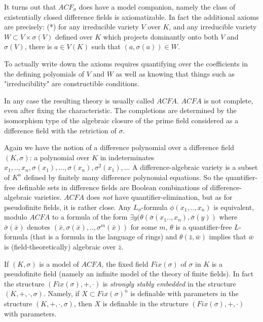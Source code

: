 It turns out that $ACF{_\sigma}$ does have a
model companion, namely the class of
existentially closed difference fields is
axiomatizable. In fact the additional axioms
are precisely:
\newline
(*) for any irreducible variety $V$ over $K$,
and any irreducible variety $W\subset
V\times\sigma(V)$ defined over $K$ which
projects dominantly onto both $V$ and
$\sigma(V)$, there is $a\in V(K)$ such that
$(a, \sigma(a))\in W$.

\vspace{2mm}
\noindent
To actually write down the axioms requires
quantifying over the coefficients in the
defining polyomials of $V$ and $W$ as well as
knowing that things such as "irreducibility"
are constructible conditions.

In any case the resulting theory is usually
called $ACFA$. $ACFA$ is not complete, even
after fixing the characteristic. The
completions are determined by the isomorphism
type of the algebraic closure of the prime
field considered as a difference field with
the retriction of $\sigma$.

Again we have the notion of a difference
polynomial over a difference field
$(K,\sigma)$: a polynomial over $K$ in
indeterminates $x_{1},..,x_{n},\sigma(x_{1}),..
.,\sigma(x_{n}), \sigma^{2}(x_{1}),..$.
A difference-algebraic variety is a subset of
$K^{n}$ defined by finitely many difference
polynomial equations.
So the quantifier-free definable sets
in difference fields are Boolean combinations
of difference-algebraic varieties.
$ACFA$ does {\em not} have
quantifier-elimination, but as for
pseudofinite fields, it is rather close. Any
$L_{\sigma}$-formula $\phi(x_{1},..,x_{n})$ is
equivalent, modulo $ACFA$ to a formula of the
form
$\exists
y(\theta({\bar\sigma}(x_{1}..,x_{n}),
{\bar\sigma}(y))$ where ${\bar \sigma}({\bar
x})$ denotes $({\bar x},\sigma({\bar
x}),..,\sigma^{m}({\bar x}))$ for some $m$,
$\theta$ is a quantifier-free $L$-formula (that
is a formula in the language of rings) and
$\theta({\bar z},{\bar w})$ implies that
${\bar w}$ is (field-theoretically) algebraic
over ${\bar z}$.

If $(K,\sigma)$ is a model of $ACFA$, the fixed
field
$Fix(\sigma)$ of
$\sigma$ in
$K$ is a pseudofinite field (namely an
infinite model of the theory of finite fields).
In fact the structure
$(Fix(\sigma),+,\cdot)$ is {\em strongly stably
embedded} in the structure
$(K,+,\cdot,\sigma)$. Namely,
if
$X\subset Fix(\sigma)^{n}$ is definable with
parameters in the structure
$(K,+,\cdot,\sigma)$, then $X$ is definable in
the structure $(Fix(\sigma),+,\cdot)$ with
parameters.

